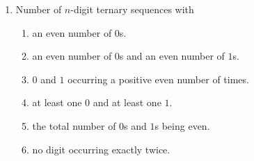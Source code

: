 \documentclass[svgnames]{amsart}
\begin{document}
\begin{enumerate}[leftmargin=*]
\item Number of $n$-digit ternary sequences with
\begin{enumerate}[label=(\roman*)]
	\item an even number of $0$s.
	\item an even number of $0$s and an even number of $1$s.
	\item $0$ and $1$ occurring a positive even number of times.
	\item at least one $0$ and at least one $1$.
	\item the total number of $0$s and $1$s being even.
	\item no digit occurring exactly twice.
\end{enumerate}
\end{enumerate}
\end{document}
